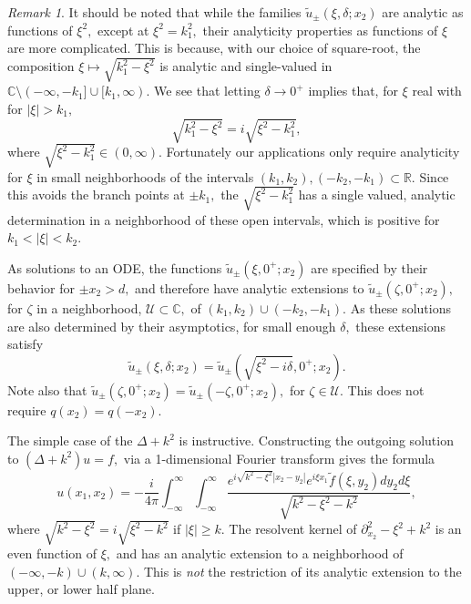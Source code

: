 \documentclass[11pt]{article}
\newcommand\cU{\mathcal U}
\newcommand\tu{\widetilde u}
\newcommand\tf{\tilde{f}}
\newcommand\bbC{\mathbb C}
\newcommand\bbR{\mathbb R}
\newcommand\pa{\partial}
\theoremstyle{definition}
\theoremstyle{remark}
\newtheorem{remark}{Remark}
\begin{document}
\begin{remark}\label{rmk1}
  It should be noted that while the families
  $\tu_{\pm}(\xi,\delta;x_2)$ are analytic as functions of $\xi^2,$ except at $\xi^2=k_1^2,$
  their analyticity properties as functions of $\xi$ are more
  complicated. This is because, with our choice of square-root, the
  composition $\xi\mapsto\sqrt{k_1^2-\xi^2}$ is analytic and
  single-valued in $\bbC\setminus (-\infty,-k_1]\cup [k_1,\infty).$
      We see that letting $\delta\to 0^+$ implies that, for $\xi$ real
   with for $|\xi|>k_1,$
   $$\sqrt{k_1^2-\xi^2}=i\sqrt{\xi^2-k_1^2},$$ where
   $\sqrt{\xi^2-k_1^2}\in(0,\infty).$ Fortunately our applications
   only require analyticity for $\xi$ in small neighborhoods of the
   intervals $(k_1,k_2),(-k_2,-k_1)\subset\bbR.$ Since this avoids the
   branch points at $\pm k_1,$ the $\sqrt{\xi^2-k_1^2}$ has a single
   valued, analytic determination in a neighborhood of these open
   intervals, which is positive for $k_1<|\xi|<k_2.$

   As solutions to an ODE,
   the functions $\tu_{\pm}(\xi,0^+;x_2)$ are specified by their
   behavior for $\pm x_2>d,$ and therefore have analytic extensions to
   $\tu_{\pm}(\zeta,0^+;x_2),$ for $\zeta$ in a neighborhood,
   $\cU\subset\bbC,$ of $(k_1,k_2)\cup (-k_2,-k_1).$ As these
   solutions are also determined by their asymptotics, for small enough
   $\delta,$ these extensions satisfy
   $$\tu_{\pm}(\xi,\delta;x_2)=\tu_{\pm}(\sqrt{\xi^2-i\delta},0^+;x_2).$$
   Note also that
   $\tu_{\pm}(\zeta,0^+;x_2)=\tu_{\pm}(-\zeta,0^+;x_2),$ for $\zeta\in
   \cU.$ This does not require $q(x_2)=q(-x_2).$

   The simple case of the $\Delta+k^2$ is instructive. Constructing
   the outgoing solution to $(\Delta+k^2)u=f,$ via a 1-dimensional
   Fourier transform gives the formula
   \begin{equation}
     u(x_1,x_2)=-\frac{i}{4\pi}\int_{-\infty}^{\infty}\int_{-\infty}^{\infty}
     \frac{e^{i\sqrt{k^2-\xi^2}|x_2-y_2|}e^{i\xi x_1}\tf(\xi,y_2)dy_2
       d\xi}{\sqrt{k^2-\xi^2-k^2}},
   \end{equation}
   where $\sqrt{k^2-\xi^2}=i\sqrt{\xi^2-k^2}$ if $|\xi|\geq k.$ The
   resolvent kernel of $\pa_{x_2}^2-\xi^2+k^2$ is an even function of $\xi,$
   and has an analytic extension to a neighborhood of
   $(-\infty,-k)\cup (k,\infty).$ This is {\em not} the restriction of its
   analytic extension to the upper, or lower half plane.
\end{remark}
\end{document}

